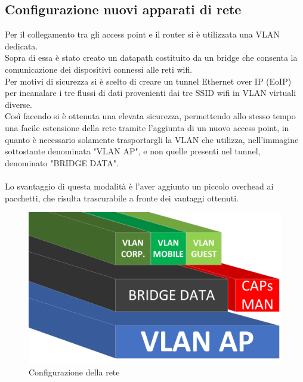 \documentclass[Realizzazione.tex]{subfiles}
\begin{document}
\newpage
\subsection{Configurazione nuovi apparati di rete}
Per il collegamento tra gli access point e il router si è utilizzata una VLAN dedicata. \\
Sopra di essa è stato creato un datapath costituito da un bridge che consenta la comunicazione dei dispositivi connessi alle reti wifi. \\
Per motivi di sicurezza si è scelto di creare un tunnel Ethernet over IP (EoIP) per incanalare i tre flussi di dati provenienti dai tre SSID wifi in VLAN virtuali diverse. \\
Così facendo si è ottenuta una elevata sicurezza, permettendo allo stesso tempo una facile estensione della rete tramite l'aggiunta di un nuovo access point, in quanto è necessario solamente trasportargli la VLAN che utilizza, nell'immagine sottostante denominata "VLAN AP", e non quelle presenti nel tunnel, denominato "BRIDGE DATA". \\\\
Lo svantaggio di questa modalità è l'aver aggiunto un piccolo overhead ai pacchetti, che risulta trascurabile a fronte dei vantaggi ottenuti.

\begin{figure}[H]
	\centering
	\includegraphics[width=0.6\linewidth]{"images/VLAN"}
	\caption{Configurazione della rete}
	\label{fig:Configurazione della rete}
\end{figure}
\end{document}
